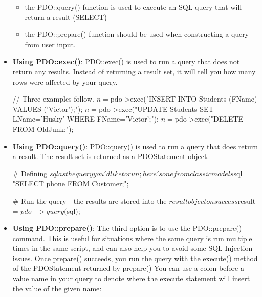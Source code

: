 \documentclass{report}
\begin{document}
\begin{itemize}
\begin{itemize}
                \item the PDO::query() function is used to execute an SQL query that will return a result (SELECT)
                \item the PDO::prepare() function should be used when constructing a query from user input.
            \end{itemize}
        \item \textbf{Using PDO::exec()}: PDO::exec() is used to run a query that does not return any results. Instead of returning a result set, it will tell you how many rows were affected by your query.
            \bigbreak \noindent 
            \begin{bashcode}
                // Three examples follow.
                $n = $pdo->exec("INSERT INTO Students (FName) VALUES ('Victor');");
                $n = $pdo->exec("UPDATE Students SET LName='Husky' WHERE FName='Victor';");
                $n = $pdo->exec("DELETE FROM OldJunk;");
            \end{bashcode}
        \item \textbf{Using PDO::query()}: PDO::query() is used to run a query that does return a result. The result set is returned as a PDOStatement object.
            \bigbreak \noindent 
            \begin{bashcode}
                # Defining $sql as the query you'd like to run; here's one from classicmodels
                $sql = "SELECT phone FROM Customer;";

                # Run the query - the results are stored into the $result object on success
                $result = $pdo->query($sql);
            \end{bashcode}
        \item \textbf{Using PDO::prepare()}: The third option is to use the PDO::prepare() command. This is useful for situations where the same query is run multiple times in the same script, and can also help you to avoid some SQL Injection issues. Once prepare() succeeds, you run the query with the execute() method of the PDOStatement returned by prepare()
            \bigbreak \noindent 
            You can use a colon before a value name in your query to denote where the execute statement will insert the value of the given name:
            \bigbreak \noindent 
\end{itemize}
\end{document}
